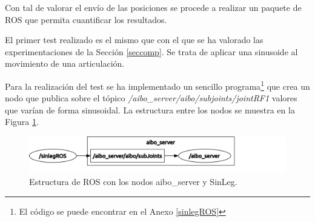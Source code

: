 \documentclass[12pt,a4paper,final,twoside]{book}
\begin{document}
Con tal de valorar el envío de las posiciones se procede a realizar un paquete de ROS que permita cuantificar los resultados.

El primer test realizado es el mismo que con el que se ha valorado las experimentaciones de la Sección \ref{seccomp}. Se trata de aplicar una sinusoide al movimiento de una articulación.

Para la realización del test se ha implementado un sencillo programa\footnote{El código se puede encontrar en el Anexo \ref{sinlegROS}} que crea un nodo que publica sobre el tópico \textit{/aibo{\_}server/aibo/subjoints/jointRF1} valores que varían de forma sinusoidal. 
La estructura entre los nodos se muestra en la Figura \ref{fig:ASSL}.
\begin{figure}[H]
	\centering
    \includegraphics[scale=0.35]{images/rosgraphASsin.pdf}
	 \caption{Estructura de ROS con los nodos aibo\_server y SinLeg.}
  \label{fig:ASSL}
\end{figure}
\end{document}
